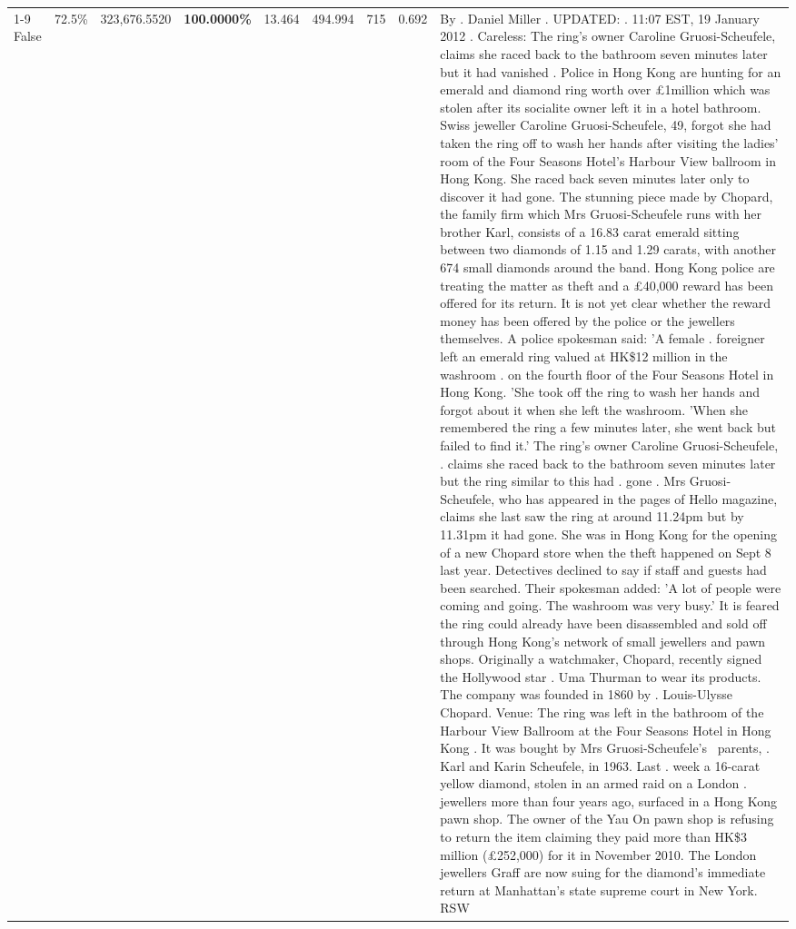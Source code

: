 \begin{table}[H]
\begin{tabular}{lllrlllll}
\cline{1-9}
False & 72.5\% & 323,676.5520 & \bfseries \color{red} 100.0000\% & 13.464 & 494.994 & 715 & 0.692 & By . Daniel Miller . UPDATED: . 11:07 EST, 19 January 2012 . Careless: The ring's owner Caroline Gruosi-Scheufele, claims she raced back to the bathroom seven minutes later but it had vanished . Police in Hong Kong are hunting for an emerald and diamond ring worth over £1million which was stolen after its socialite owner left it in a hotel bathroom. Swiss jeweller Caroline Gruosi-Scheufele, 49, forgot she had taken the ring off to wash her hands after visiting the ladies' room of the Four Seasons Hotel's Harbour View ballroom in Hong Kong. She raced back seven minutes later only to discover it had gone. The stunning piece made by Chopard, the family firm which Mrs Gruosi-Scheufele runs with her brother Karl, consists of a 16.83 carat emerald sitting between two diamonds of 1.15 and 1.29 carats, with another 674 small diamonds around the band. Hong Kong police are treating the matter as theft and a £40,000 reward has been offered for its return. It is not yet clear whether the reward money has been offered by the police or the jewellers themselves. A police spokesman said: 'A female . foreigner left an emerald ring valued at HK\$12 million in the washroom . on the fourth floor of the Four Seasons Hotel in Hong Kong. 'She took off the ring to wash her hands and forgot about it when she left the washroom. 'When she remembered the ring a few minutes later, she went back but failed to find it.' The ring's owner Caroline Gruosi-Scheufele, . claims she raced back to the bathroom seven minutes later but the ring similar to this had . gone . Mrs Gruosi-Scheufele, who has appeared in the pages of Hello magazine, claims she last saw the ring at around 11.24pm but by 11.31pm it had gone. She was in Hong Kong for the opening of a new Chopard store when the theft happened on Sept 8 last year. Detectives declined to say if staff and guests had been searched. Their spokesman added: 'A lot of people were coming and going. The washroom was very busy.' It is feared the ring could already have been disassembled and sold off through Hong Kong's network of small jewellers and pawn shops. Originally a watchmaker, Chopard, recently signed the Hollywood star . Uma Thurman to wear its products. The company was founded in 1860 by . Louis-Ulysse Chopard. Venue: The ring was left in the bathroom of the Harbour View Ballroom at the Four Seasons Hotel in Hong Kong . It was bought by Mrs Gruosi-Scheufele's  parents, . Karl and Karin Scheufele, in 1963. Last . week a 16-carat yellow diamond, stolen in an armed raid on a London . jewellers more than four years ago, surfaced in a Hong Kong pawn shop. The owner of the Yau On pawn shop is refusing to return the item claiming they paid more than HK\$3 million (£252,000) for it in November 2010. The London jewellers Graff are now suing for the diamond’s immediate return at Manhattan’s state supreme court in New York. RSW \\

\end{tabular}
\end{table}
